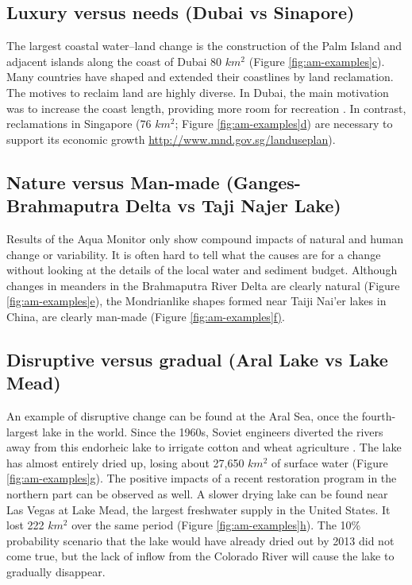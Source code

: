 \subsection{Luxury versus needs (Dubai vs Sinapore)}
The largest coastal water–land change is the construction of the Palm Island and adjacent islands along the coast of Dubai 80 $km^2$ (Figure \hyperref[fig:am-examples]{\ref{fig:am-examples}c}). Many countries have shaped and extended their coastlines by land reclamation. The motives to reclaim land are highly diverse. In Dubai, the main motivation was to increase the coast length, providing more room for recreation \citet{Davidson2009}. In contrast, reclamations in Singapore (76 $km^2$; Figure \hyperref[fig:am-examples]{\ref{fig:am-examples}d}) are necessary to support its economic growth \url{http://www.mnd.gov.sg/landuseplan}).

\subsection{Nature versus Man-made (Ganges-Brahmaputra Delta vs Taji Najer Lake)}
Results of the Aqua Monitor only show compound impacts of natural and human change or variability. It is often hard to tell what the causes are for a change without looking at the details of the local water
and sediment budget. Although changes in meanders in the Brahmaputra River Delta are clearly natural (Figure \hyperref[fig:am-examples]{\ref{fig:am-examples}e}), the Mondrianlike shapes formed near Taiji Nai’er lakes in China, are clearly man-made (Figure \hyperref[fig:am-examples]{\ref{fig:am-examples}f)}.

\subsection{Disruptive versus gradual (Aral Lake vs Lake Mead)}
An example of disruptive change can be found at the Aral Sea, once the fourth-largest lake in the world. Since the 1960s, Soviet engineers diverted the rivers away from this endorheic lake to irrigate cotton and wheat agriculture \citet{Glantz1999}. The lake has almost entirely dried up, losing about 27,650 $km^2$ of surface water (Figure \hyperref[fig:am-examples]{\ref{fig:am-examples}g}). The positive impacts of a recent restoration program \citet{Micklin2016} in the northern part can be observed as well. A slower drying lake can be found near Las Vegas at Lake Mead, the largest freshwater supply in the United States. It lost 222 $km^2$ over the same period (Figure \hyperref[fig:am-examples]{\ref{fig:am-examples}h}). The 10\% probability scenario that the lake would have already dried out by 2013 \citet{Barnett2008} did not come true, but the lack of inflow from the Colorado River will cause the lake to gradually disappear.

